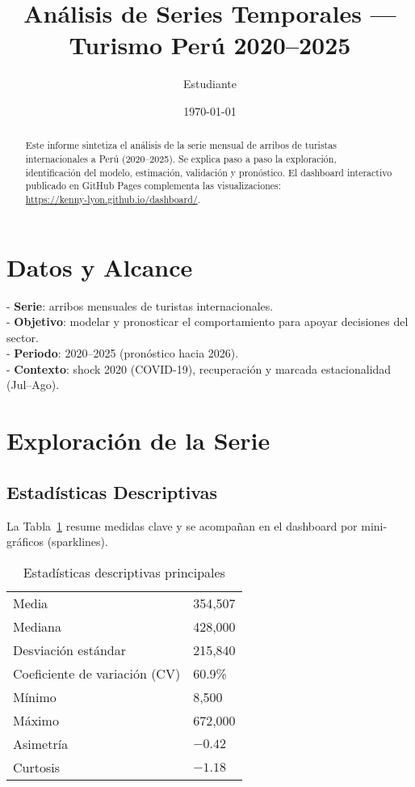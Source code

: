 \documentclass[11pt,a4paper]{article}
\title{Análisis de Series Temporales — Turismo Perú 2020--2025}
\author{Estudiante}
\date{\today}
\begin{document}
\maketitle

\begin{abstract}
Este informe sintetiza el análisis de la serie mensual de arribos de turistas internacionales a Perú (2020--2025). Se explica paso a paso la exploración, identificación del modelo, estimación, validación y pronóstico. El dashboard interactivo publicado en GitHub Pages complementa las visualizaciones: \\[-0.3em]
\href{https://kenny-lyon.github.io/dashboard/}{https://kenny-lyon.github.io/dashboard/}.
\end{abstract}

\section{Datos y Alcance}
- \textbf{Serie}: arribos mensuales de turistas internacionales.\\
- \textbf{Objetivo}: modelar y pronosticar el comportamiento para apoyar decisiones del sector.\\
- \textbf{Periodo}: 2020--2025 (pronóstico hacia 2026).\\
- \textbf{Contexto}: shock 2020 (COVID-19), recuperación y marcada estacionalidad (Jul--Ago).

\section{Exploración de la Serie}
\subsection{Estadísticas Descriptivas}
La Tabla~\ref{tab:descriptivo} resume medidas clave y se acompañan en el dashboard por mini-gráficos (sparklines).
\begin{table}[h]
  \centering
  \caption{Estadísticas descriptivas principales}
  \label{tab:descriptivo}
  \begin{tabular}{ll}
    \toprule
    Media & 354,507 \\
    Mediana & 428,000 \\
    Desviación estándar & 215,840 \\
    Coeficiente de variación (CV) & 60.9\% \\
    Mínimo & 8,500 \\
    Máximo & 672,000 \\
    Asimetría & $-0.42$ \\
    Curtosis & $-1.18$ \\
    \bottomrule
  \end{tabular}
\end{table}
\end{document}
